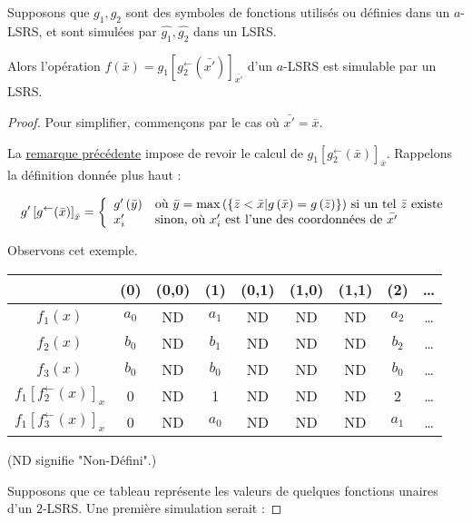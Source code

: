 \documentclass{report}
\newcommand{\eqpred}[3]{#1\left[ #2^{\leftarrow}(#3) \right]_{#3}}
\newcommand{\eqpredf}[4]{#1\left[ #2^{\leftarrow}(#3) \right]_{#4}} %
\begin{document}
	\begin{lemma}
		Supposons que $g_1, g_2$ sont des symboles de fonctions utilisés ou définies dans un $a$-LSRS, et sont simulées par $\hat{g_1},\hat{g_2}$ dans un LSRS.
		
		Alors l'opération $f\left(\bar{x}\right) = \eqpredf{g_1}{g_2}{\bar{x'}}{\bar{x'}}$ d'un $a$-LSRS est simulable par un LSRS.
	\end{lemma}
	
	\begin{proof}		
		Pour simplifier, commençons par le cas où $\bar{x'} = \bar{x}$. 
		
		La \hyperref[rk:fonctions_en_attente]{remarque précédente} impose de revoir le calcul de $\eqpredf{g_1}{g_2}{\bar{x}}{\bar{x}}$. Rappelons la définition donnée plus haut : 
		
		\[
			\eqpred{g'}{g}{\bar{x}} = \casedist{
				g'\left( \bar{y} \right) & \text{où $\bar{y} = \maxset{\bar{z} < \bar{x} | g\left( \bar{x} \right) = g\left( \bar{z} \right)}$ si un tel $\bar{z}$ existe} \\
				x'_i & \text{sinon, où $x'_i$ est l'une des coordonnées de $\bar{x'}$}
			}
		\]
		
		Observons cet exemple.
		
		\espace 
		\begin{center}
			\begin{tabular}{|c|cccccccc|}
				\hline
									& (0)	& (0,0)	& (1)	& (0,1)	& (1,0)	& (1,1)	& (2)	& \dots \\
				\hline
				$f_1(x)$ 			& $a_0$	& ND	& $a_1$	& ND	& ND	& ND	& $a_2$	& \dots \\
				$f_2(x)$ 			& $b_0$	& ND	& $b_1$	& ND	& ND	& ND	& $b_2$	& \dots \\
				$f_3(x)$	 		& $b_0$	& ND	& $b_0$	& ND	& ND	& ND	& $b_0$	& \dots \\
				$\eqpred{f_1}{f_2}{x}$
									& 0		& ND	& 1		& ND	& ND	& ND	& 2		& \dots \\
				$\eqpred{f_1}{f_3}{x}$
									& 0		& ND	& $a_0$	& ND	& ND	& ND	& $a_1$	& \dots \\
				\hline 
				
			\end{tabular}
		\end{center}

			
		\espace 
		(ND signifie "Non-Défini".)
			
		Supposons que ce tableau représente les valeurs de quelques fonctions unaires d'un $2$-LSRS. Une première simulation serait :
		

\end{proof}
\end{document}
